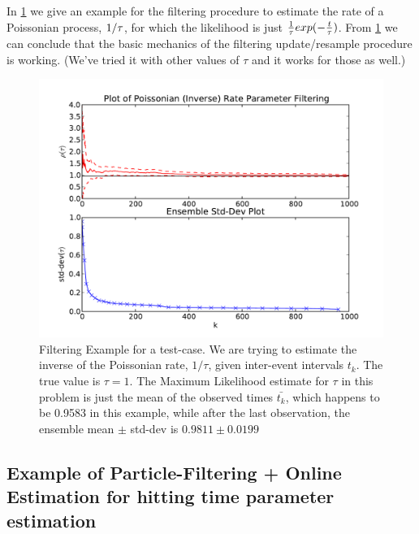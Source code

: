 \documentclass{article}
\begin{document}
In \cref{fig:poissonian_rate_filtering} we give an example for the filtering
procedure to estimate the rate of a Poissonian process, $1/{\tau}$, for which  the
likelihood is just $\tfrac 1{{\tau}} exp(- \tfrac t{{\tau}})$. From
\cref{fig:poissonian_rate_filtering} we can conclude that the basic mechanics of
the filtering update/resample procedure is working. (We've tried it with other
values of $\tau$ and it works for those as well.)

\begin{figure}[htp]
\begin{center}
  \includegraphics[width=\textwidth]{Figs/TauParticleEnsemble/poisson_rate_filtering.pdf}
  \caption{Filtering Example for a test-case. We are trying to estimate the
  inverse of the Poissonian rate, $1/\tau$, given inter-event intervals $t_k$.
  The true value is $\tau  = 1$. The Maximum Likelihood estimate for $\tau$ in
  this problem  is just the mean of the observed times $\bar{t_k}$, which
  happens to be 0.9583 in this example, while after the last observation, the
  ensemble mean $\pm$ std-dev is $0.9811\pm 0.0199$}
  \label{fig:poissonian_rate_filtering}
\end{center}
\end{figure}


\subsection{Example of Particle-Filtering + Online Estimation for hitting time
parameter estimation}
\end{document}
